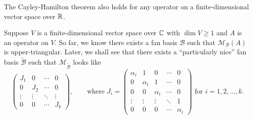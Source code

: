 \begin{remarkenv}
    The Cayley-Hamilton theorem also holds for any operator on a finite-dimensional vector space over $\mathbb{R}$.
\end{remarkenv}
\begin{remarkenv}
    Suppose $V$ is a finite-dimensional vector space over $\mathbb{C}$ with $\dim V \ge 1$ and $A$ is an operator on $V$. So far, we know there exists a fan basis $\mathcal B$ such that $\mathcal M_{\mathcal{B}} (A)$ is upper-triangular. Later, we shall see that there exists a ``particularly nice'' fan basis $\widetilde{\mathcal{B}}$ such that $\mathcal{M}_{\widetilde{\mathcal{B}}}$ looks like
    $$
    \begin{pmatrix}
        J_1 & 0 & \cdots & 0 \\
        0 & J_2 & \cdots & 0 \\
        \vdots & \vdots & \ddots & \vdots \\
        0 & 0 & \cdots & J_k
    \end{pmatrix},
    \qquad
    \text{where }
    J_i =
    \begin{pmatrix}
        \alpha_i & 1 & 0 & \cdots & 0 \\
        0 & \alpha_i & 1 & \cdots & 0 \\
        0 & 0 & \alpha_i & \cdots & 0 \\
        \vdots & \vdots & \vdots & \ddots & 1 \\
        0 & 0 & 0 & \cdots & \alpha_i
    \end{pmatrix}
        \text{ for } i=1,2,\ldots,k.
    $$
\end{remarkenv}
